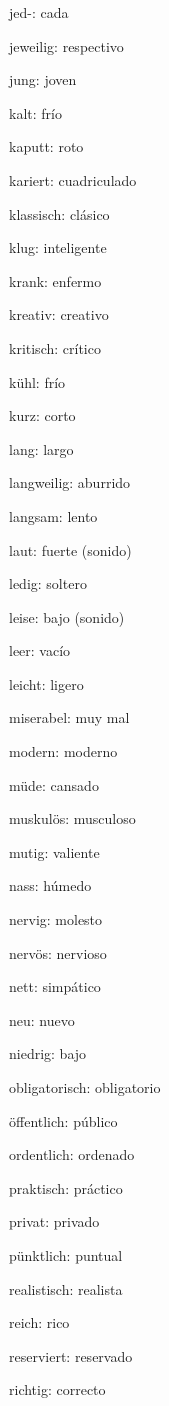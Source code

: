 \begin{multicols}{2}
\begin{myitemize}
\item jed-: cada
\item jeweilig: respectivo
\item jung: joven
\item kalt: frío
\item kaputt: roto
\item kariert: cuadriculado
\item klassisch: clásico
\item klug: inteligente
\item krank: enfermo
\item kreativ: creativo
\item kritisch: crítico
\item kühl: frío
\item kurz: corto
\item lang: largo
\item langweilig: aburrido
\item langsam: lento
\item laut: fuerte (sonido)
\item ledig: soltero
\item leise: bajo (sonido)
\item leer: vacío
\item leicht: ligero
\item miserabel: muy mal
\item modern: moderno
\item müde: cansado
\item muskulös: musculoso
\item mutig: valiente
\item nass: húmedo
\item nervig: molesto
\item nervös: nervioso
\item nett: simpático
\item neu: nuevo
\item niedrig: bajo
\item obligatorisch: obligatorio
\item öffentlich: público
\item ordentlich: ordenado
\item praktisch: práctico
\item privat: privado
\item pünktlich: puntual
\item realistisch: realista
\item reich: rico
\item reserviert: reservado
\item richtig: correcto

\end{myitemize}
\end{multicols}
